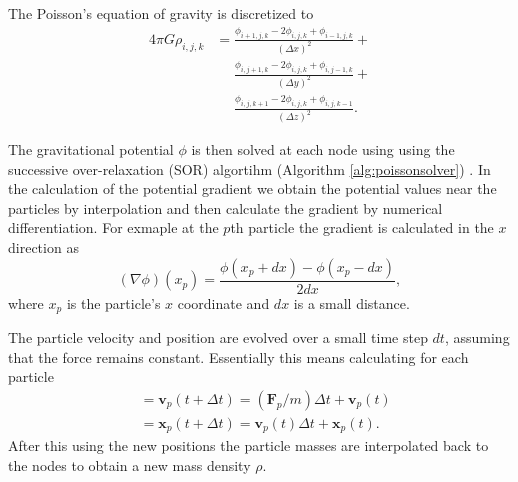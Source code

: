 \documentclass[notitlepage, 12pt]{article}
\begin{document}
The Poisson's equation of gravity is discretized to 
\begin{equation} \label{eq:discretized_poisson}
\begin{aligned}
4\pi G\rho_{i,j,k} &= \frac{\phi_{i+1,j,k}-2\phi_{i,j,k}+\phi_{i-1,j,k}}{(\Delta x)^2}+\\
& \phantom{{}={}} \frac{\phi_{i,j+1,k}-2\phi_{i,j,k}+\phi_{i,j-1,k}}{(\Delta y)^2}+\\
& \phantom{{}={}} \frac{\phi_{i,j,k+1}-2\phi_{i,j,k}+\phi_{i,j,k-1}}{(\Delta z)^2}.
\end{aligned}
\end{equation}

The gravitational potential $\phi$ is then solved at each node using using the successive over-relaxation (SOR) algortihm (Algorithm \ref{alg:poissonsolver}) . In the calculation of the potential gradient we obtain the potential values near the particles by interpolation and then calculate the gradient by numerical differentiation. For exmaple at the $p$th particle the gradient is calculated in the $x$ direction as
\begin{equation}
(\nabla \phi)(x_p)=\frac{\phi(x_p+dx)-\phi(x_p-dx)}{2dx},
\end{equation}
where $x_p$ is the particle's $x$ coordinate and $dx$ is a small distance.  

The particle velocity and position are evolved over a small time step $dt$, assuming that the force remains constant. Essentially this means calculating for each particle
\begin{align}
&=\mathbf{v}_p(t+\Delta t) = (\mathbf{F}_p/m)\Delta t + \mathbf{v}_p(t)\\
&=\mathbf{x}_p(t+\Delta t) = \mathbf{v}_p(t)\Delta t + \mathbf{x}_p(t).
\end{align}
After this using the new positions the particle masses are interpolated back to the nodes to obtain a new mass density $\rho$.
\end{document}
